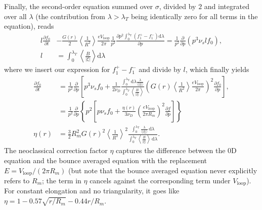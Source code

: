 \documentclass[11pt,a4paper]{article}
\newcommand{\rd}{\ensuremath{\mathrm{d}}}
\newcommand{\sub}[1]{\ensuremath{_{\text{#1}}}}
\begin{document}
Finally, the second-order equation summed over $\sigma$, divided by $2$ and integrated over all $\lambda$ (the contribution from $\lambda > \lambda_T$ being identically zero for all terms in the equation), reads
\begin{align}
l\frac{\partial  f_0}{\partial t} &- \frac{G(r)}{2} \left\langle\frac{1}{R^2}\right\rangle\frac{eV\sub{loop}}{2\pi}\frac{1}{p^2}\frac{\partial  p^2\int_0^{\lambda\sub{T}}(f_1^+-f_1^-)\rd\lambda}{\partial p} = \frac{1}{p^2}\frac{\partial}{\partial p}\left( p^3 \nu_s l f_0\right), \nonumber \\
l &= \int_0^{\lambda_T} \left\langle\frac{B}{|\xi|}\right\rangle \rd\lambda
\end{align}
where we insert our expression for $f_1^+-f_1^-$ and divide by $l$, which finally yields
\begin{align}
\frac{\partial f_0}{\partial t} &= \frac{1}{p^2}\frac{\partial}{\partial p}\left[ p^3\nu_s f_0 +\frac{1}{2\nu_D} \frac{\int_0^{\lambda\sub{T}} \rd \lambda \frac{\lambda}{\langle |\xi|\rangle}}{\int_0^{\lambda_T} \left\langle\frac{B}{|\xi|}\right\rangle} \left(G(r)\left\langle\frac{1}{R^2}\right\rangle\frac{eV\sub{loop}}{2\pi}\right)^2\frac{\partial f_0}{\partial p}\right], \nonumber \\
 &= \frac{1}{p^2}\frac{\partial}{\partial p}\left\{p^2 \left[p\nu_s f_0 + \frac{\eta(r)}{3\nu_D}\left(\frac{eV\sub{loop}}{2\pi R_m}\right)^2 \frac{\partial f}{\partial p}\right]\right\} \nonumber \\
\eta(r) &= \frac{3}{2}R_m^2 G(r)^2 \left\langle\frac{1}{R^2}\right\rangle^2 \frac{\int_0^{\lambda\sub{T}} \frac{\lambda}{\langle|\xi|\rangle}\,\rd \lambda }{\int_0^{\lambda_T}\left\langle\frac{B}{|\xi|}\right\rangle\,\rd\lambda}.
\end{align}
The neoclassical correction factor $\eta$ captures the difference between the 0D equation and the bounce averaged equation with the replacement $E = V\sub{loop}/(2\pi R_m)$ (but note that the bounce averaged equation never explicitly refers to $R_m$; the term in $\eta$ cancels against the corresponding term under $V\sub{loop}$). For constant elongation and no triangularity, it goes like $\eta = 1-0.57\sqrt{r/R_m} - 0.44 r/R_m$.
\end{document}
